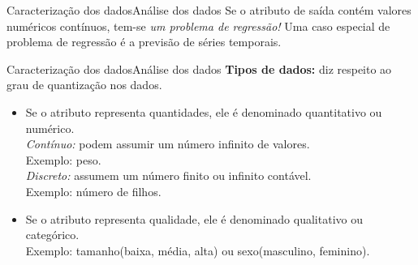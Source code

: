 \documentclass[t]{beamer}
\begin{document}

\begin{ftst}{Caracterização dos dados}{Análise dos dados}
Se o atributo de saída contém valores numéricos contínuos, tem-se \textit{um problema de regressão!}
\vone
Uma caso especial de problema de regressão é a previsão de séries temporais.

\end{ftst}


\begin{ftst}{Caracterização dos dados}{Análise dos dados}
\textbf{Tipos de dados:} diz respeito ao grau de quantização nos dados.
\vone
\begin{itemize}
    \item Se o atributo representa quantidades, ele é denominado quantitativo ou numérico.\\
    \footnotesize
    \textit{Contínuo:} podem assumir um número infinito de valores.\\
    Exemplo: peso.\\
    \textit{Discreto:} assumem um número finito ou infinito contável.\\
    Exemplo: número de filhos.
    \vone
    \normalsize
    \item Se o atributo representa qualidade, ele é denominado qualitativo ou categórico.\\
    \footnotesize
    Exemplo: tamanho(baixa, média, alta) ou sexo(masculino, feminino).
\end{itemize}

\end{ftst}

\end{document}

